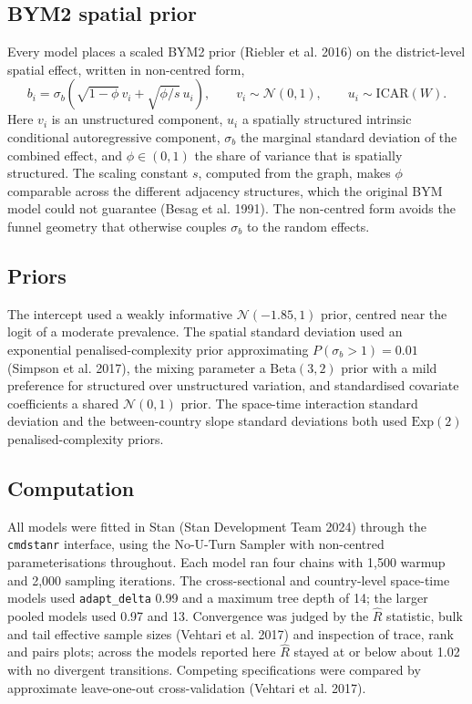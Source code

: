 \documentclass{article}
\begin{document}
\subsection{BYM2 spatial prior}\label{bym2-spatial-prior}

Every model places a scaled BYM2 prior (Riebler et al. 2016) on the
district-level spatial effect, written in non-centred form,
\begin{equation}
b_i = \sigma_b\!\left(\sqrt{1-\phi}\, v_i + \sqrt{\phi/s}\, u_i\right),
\qquad
v_i \sim \mathcal{N}(0,1),
\qquad
u_i \sim \mathrm{ICAR}(W).
\end{equation} Here \(v_i\) is an unstructured component, \(u_i\) a
spatially structured intrinsic conditional autoregressive component,
\(\sigma_b\) the marginal standard deviation of the combined effect, and
\(\phi \in (0,1)\) the share of variance that is spatially structured.
The scaling constant \(s\), computed from the graph, makes \(\phi\)
comparable across the different adjacency structures, which the original
BYM model could not guarantee (Besag et al. 1991). The non-centred form
avoids the funnel geometry that otherwise couples \(\sigma_b\) to the
random effects.

\subsection{Priors}\label{priors}

The intercept used a weakly informative \(\mathcal{N}(-1.85, 1)\) prior,
centred near the logit of a moderate prevalence. The spatial standard
deviation used an exponential penalised-complexity prior approximating
\(P(\sigma_b > 1) = 0.01\) (Simpson et al. 2017), the mixing parameter a
\(\mathrm{Beta}(3,2)\) prior with a mild preference for structured over
unstructured variation, and standardised covariate coefficients a shared
\(\mathcal{N}(0,1)\) prior. The space-time interaction standard
deviation and the between-country slope standard deviations both used
\(\mathrm{Exp}(2)\) penalised-complexity priors.

\subsection{Computation}\label{computation}

All models were fitted in Stan (Stan Development Team 2024) through the
\texttt{cmdstanr} interface, using the No-U-Turn Sampler with
non-centred parameterisations throughout. Each model ran four chains
with 1,500 warmup and 2,000 sampling iterations. The cross-sectional and
country-level space-time models used \texttt{adapt\_delta} 0.99 and a
maximum tree depth of 14; the larger pooled models used 0.97 and 13.
Convergence was judged by the \(\hat{R}\) statistic, bulk and tail
effective sample sizes (Vehtari et al. 2017) and inspection of trace,
rank and pairs plots; across the models reported here \(\hat{R}\) stayed
at or below about 1.02 with no divergent transitions. Competing
specifications were compared by approximate leave-one-out
cross-validation (Vehtari et al. 2017).
\end{document}

